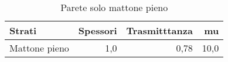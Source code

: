 \begin{table}
\centering
\caption{Parete solo mattone pieno}
\begin{tabular}{lrrr}
\toprule
        Strati & Spessori & Trasmitttanza &    mu \\
\midrule
 Mattone pieno &      1,0 &          0,78 &  10,0 \\
\bottomrule
\end{tabular}
\end{table}
